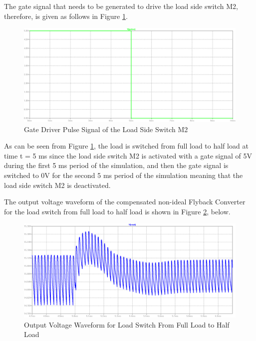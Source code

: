 The gate signal that needs to be generated to drive the load side switch M2, therefore, is given as follows in Figure \ref{com:pulse_FH}.

\begin{figure}[H]
\begin{center}
\includegraphics[width=1\textwidth]{comp_simulations/pulse_FH.png}
\caption{Gate Driver Pulse Signal of the Load Side Switch M2}
\label{com:pulse_FH}
\end{center}
\end{figure}

As can be seen from Figure \ref{com:pulse_FH}, the load is switched from full load to half load at time t = 5 ms since the load side switch M2 is activated with a gate signal of 5V during the first 5 ms period of the simulation, and then the gate signal is switched to 0V for the second 5 ms period of the simulation meaning that the load side switch M2 is deactivated.

The output voltage waveform of the compensated non-ideal Flyback Converter for the load switch from full load to half load is shown in Figure \ref{com:Vout_FH}, below.

\begin{figure}[H]
\begin{center}
\includegraphics[width=1\textwidth]{comp_simulations/Vout_FH.png}
\caption{Output Voltage Waveform for Load Switch From Full Load to Half Load}
\label{com:Vout_FH}
\end{center}
\end{figure}

